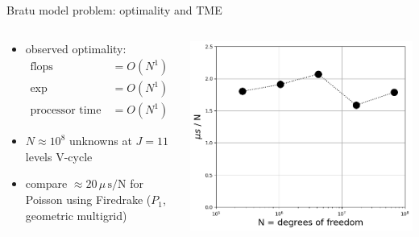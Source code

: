 \documentclass[svgnames,
               hyperref={colorlinks,citecolor=DeepPink4,linkcolor=FireBrick,urlcolor=Maroon},
               usepdftitle=false]  %
               {beamer}
\begin{document}
\begin{frame}{Bratu model problem: optimality and TME}

\begin{columns}
\begin{column}{0.45\textwidth}
\begin{itemize}
\item observed optimality:
\begin{align*}
\text{flops} &= O(N^1) \\
\text{exp evaluations} &= O(N^1) \\
\text{processor time} &= O(N^1)
\end{align*}
\item $N\approx 10^8$ unknowns at $J=11$ levels V-cycle
\item compare $\approx 20\,\mu\,\text{s}/\text{N}$ for Poisson using Firedrake ($P_1$, geometric multigrid)
\end{itemize}
\end{column}
\begin{column}{0.55\textwidth}
\includegraphics[width=\textwidth]{../talk-oxford/images/bratu-time.png}
\end{column}
\end{columns}
\end{frame}
\end{document}
